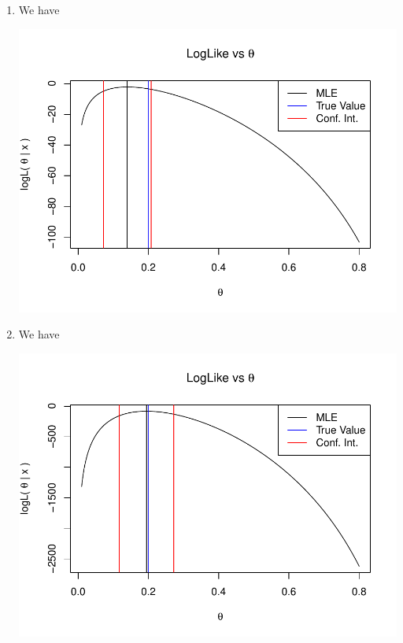 \documentclass[12pt]{article}\usepackage[]{graphicx}\usepackage[]{color}
\makeatletter
\def\maxwidth{ %
  \ifdim\Gin@nat@width>\linewidth
    \linewidth
  \else
    \Gin@nat@width
  \fi
}
\newenvironment{knitrout}{}{} %
\makeatother
\begin{document}
\begin{enumerate}
\begin{enumerate}[label = (\alph*)]
\begin{knitrout}
{}



\end{knitrout}

\item We have
\begin{knitrout}
\color{fgcolor}

{\centering \includegraphics[width=\maxwidth]{figure/plot10e-1} 

}



\end{knitrout}

\item We have 
\begin{knitrout}
\color{fgcolor}

{\centering \includegraphics[width=\maxwidth]{figure/plot10f-1} 

}
\end{knitrout}
\end{enumerate}
\end{enumerate}
\end{document}
